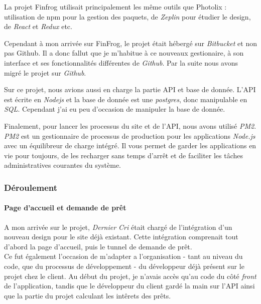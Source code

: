 \bigskip

La projet Finfrog utilisait principalement les même outils que Photolix
: utilisation de npm pour la gestion des paquets, de \emph{Zeplin} pour
étudier le design, de \emph{React} et \emph{Redux} etc.

\bigskip

Cependant à mon arrivée sur FinFrog, le projet était hébergé sur
\emph{Bitbucket} et non pas Github. Il a donc fallut que je m'habitue à
ce nouveaux gestionaire, à son interface et ses fonctionnalités
différentes de \emph{Github}. Par la suite nous avons migré le projet
sur \emph{Github}.

\bigskip

Sur ce projet, nous avions aussi en charge la partie API et base de
donnée. L'API est écrite en \emph{Nodejs} et la base de donnée est une
\emph{postgres}, donc manipulable en \emph{SQL}. Cependant j'ai eu peu
d'occasion de manipuler la base de donnée.

\bigskip

Finalement, pour lancer les processus du site et de l'API, nous avons
utilisé \emph{PM2}. \emph{PM2} est un gestionnaire de processus de
production pour les applications \emph{Node.js} avec un équilibreur de
charge intégré. Il vous permet de garder les applications en vie pour
toujours, de les recharger sans temps d'arrêt et de faciliter les tâches
administratives courantes du système.

\bigskip

\subsubsection{Déroulement}\label{duxe9roulement-1}

\paragraph{Page d'accueil et demande de
prêt}\label{page-daccueil-et-demande-de-pruxeat}

\bigskip

A mon arrivée sur le projet, \emph{Dernier Cri} était chargé de
l'intégration d'un nouveau design pour le site déjà existant. Cette
intégration comprenait tout d'abord la page d'accueil, puis le tunnel de
demande de prêt.\\
Ce fut également l'occasion de m'adapter a l'organisation - tant au
niveau du code, que du processus de développement - du développeur déjà
présent sur le projet chez le client. Au début du projet, je n'avais
accès qu'au code du côté \emph{front} de l'application, tandis que le
développeur du client gardé la main sur l'API ainsi que la partie du
projet calculant les intêrets des prêts.


